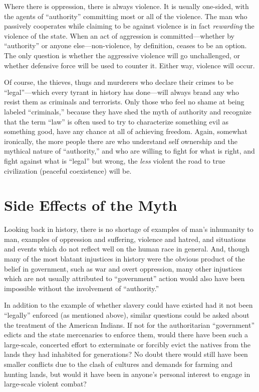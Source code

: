 \documentclass{book}
\begin{document}
Where there is oppression, there is always violence. It is usually one-sided, with the agents of \enquote{authority} committing most or all of the violence. The man who passively cooperates while claiming to be against violence is in fact \emph{rewarding} the violence of the state. When an act of aggression is committed---whether by \enquote{authority} or anyone else---non-violence, by definition, ceases to be an option. The only question is whether the aggressive violence will go unchallenged, or whether defensive force will be used to counter it. Either way, violence will occur.

Of course, the thieves, thugs and murderers who declare their crimes to be \enquote{legal}---which every tyrant in history has done---will always brand any who resist them as criminals and terrorists. Only those who feel no shame at being labeled \enquote{criminals,} because they have shed the myth of authority and recognize that the term \enquote{law} is often used to try to characterize something evil as something good, have any chance at all of achieving freedom. Again, somewhat ironically, the more people there are who understand self ownership and the mythical nature of \enquote{authority,} and who are willing to fight for what is right, and fight against what is \enquote{legal} but wrong, the \emph{less} violent the road to true civilization (peaceful coexistence) will be.

\section{Side Effects of the Myth}

Looking back in history, there is no shortage of examples of man's inhumanity to man, examples of oppression and suffering, violence and hatred, and situations and events which do not reflect well on the human race in general. And, though many of the most blatant injustices in history were the obvious product of the belief in government, such as war and overt oppression, many other injustices which are not usually attributed to \enquote{government} action would also have been impossible without the involvement of \enquote{authority.}

In addition to the example of whether slavery could have existed had it not been \enquote{legally} enforced (as mentioned above), similar questions could be asked about the treatment of the American Indians. If not for the authoritarian \enquote{government} edicts and the state mercenaries to enforce them, would there have been such a large-scale, concerted effort to exterminate or forcibly evict the natives from the lands they had inhabited for generations? No doubt there would still have been smaller conflicts due to the clash of cultures and demands for farming and hunting lands, but would it have been in anyone's personal interest to engage in large-scale violent combat?
\end{document}
